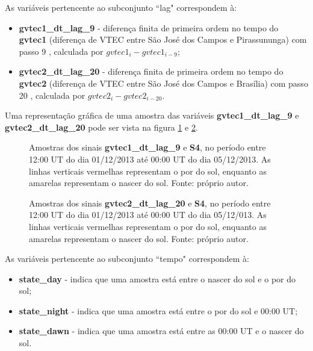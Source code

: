 As variáveis pertencente ao subconjunto ``lag" correspondem à:

\begin{itemize}
\item {\bf gvtec1\_dt\_lag\_9} - diferença finita de primeira ordem no tempo do {\bf gvtec1} (diferença de VTEC entre São José dos Campos e Pirassununga) com passo 9 , calculada por $gvtec1_i-gvtec1_{i-9}$;
\item {\bf gvtec2\_dt\_lag\_20} - diferença finita de primeira ordem no tempo do {\bf gvtec2} (diferença de VTEC entre São José dos Campos e Brasília) com passo 20 , calculada por $gvtec2_i-gvtec2_{i-20}$.
\end{itemize}

Uma representação gráfica de uma amostra das variáveis {\bf gvtec1\_dt\_lag\_9} e {\bf gvtec2\_dt\_lag\_20} pode ser vista na figura \ref{fig:scattergvtec1_lag9} e  \ref{fig:scattergvtec2_lag_20}.

\begin{figure}[H]
\centering
{}
\caption{Amostras dos sinais {\bf gvtec1\_dt\_lag\_9} e {\bf S4}, no período entre 12:00 UT do dia 01/12/2013 até 00:00 UT do dia 05/12/2013. As linhas verticais vermelhas representam o por do sol, enquanto as amarelas representam o nascer do sol. Fonte: próprio autor.}
\label{fig:scattergvtec1_lag9}
\end{figure}

\begin{figure}[H]
\centering
{}
\caption{Amostras dos sinais {\bf gvtec2\_dt\_lag\_20} e {\bf S4}, no período entre 12:00 UT do dia 01/12/2013 até 00:00 UT do dia 05/12/013. As linhas verticais vermelhas representam o por do sol, enquanto as amarelas representam o nascer do sol. Fonte: próprio autor.}
\label{fig:scattergvtec2_lag_20}
\end{figure}

As variáveis pertencente ao subconjunto ``tempo" correspondem à:

\begin{itemize}
\item {\bf state\_day} - indica que uma amostra está entre o nascer do sol e o por do sol;
\item {\bf state\_night} - indica que uma amostra está entre o por do sol e 00:00 UT;
\item {\bf state\_dawn} - indica que uma amostra está entre as 00:00 UT e o nascer do sol.
\end{itemize}


